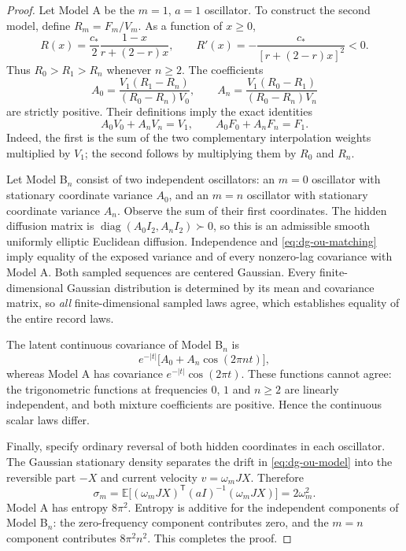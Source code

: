 \begin{proof}
Let Model A be the $m=1$, $a=1$ oscillator. To construct the second model,
define $R_m=F_m/V_m$. As a function of $x\geq0$,
\[
 R(x)=\frac{c_*}{2}\frac{1-x}{r+(2-r)x},\qquad
 R'(x)=-\frac{c_*}{[r+(2-r)x]^2}<0.
\]
Thus $R_0>R_1>R_n$ whenever $n\geq2$. The coefficients
\begin{equation}
 A_0=\frac{V_1(R_1-R_n)}{(R_0-R_n)V_0},\qquad
 A_n=\frac{V_1(R_0-R_1)}{(R_0-R_n)V_n}
 \label{eq:dg-ou-positive-weights}
\end{equation}
are strictly positive. Their definitions imply the exact identities
\begin{equation}
 A_0V_0+A_nV_n=V_1,\qquad
 A_0F_0+A_nF_n=F_1.
 \label{eq:dg-ou-matching}
\end{equation}
Indeed, the first is the sum of the two complementary interpolation
weights multiplied by $V_1$; the second follows by multiplying them by
$R_0$ and $R_n$.

Let Model B$_n$ consist of two independent oscillators: an $m=0$
oscillator with stationary coordinate variance $A_0$, and an $m=n$
oscillator with stationary coordinate variance $A_n$. Observe the sum
of their first coordinates. The hidden diffusion matrix is
$\operatorname{diag}(A_0I_2,A_nI_2)\succ0$, so this is an admissible smooth
uniformly elliptic Euclidean diffusion. Independence and
\eqref{eq:dg-ou-matching} imply equality of the exposed variance and of
every nonzero-lag covariance with Model A. Both sampled sequences are
centered Gaussian. Every finite-dimensional Gaussian distribution is
determined by its mean and covariance matrix, so \emph{all} finite-dimensional
sampled laws agree, which establishes equality of the entire record laws.

The latent continuous covariance of Model B$_n$ is
\[
 e^{-|t|}\bigl[A_0+A_n\cos(2\pi nt)\bigr],
\]
whereas Model A has covariance $e^{-|t|}\cos(2\pi t)$. These functions
cannot agree: the trigonometric functions at frequencies $0$, $1$ and
$n\geq2$ are linearly independent, and both mixture coefficients are
positive. Hence the continuous scalar laws differ.

Finally, specify ordinary reversal of both hidden coordinates in each
oscillator. The Gaussian stationary density separates the drift in
\eqref{eq:dg-ou-model} into the reversible part $-X$ and current velocity
$v=\omega_mJX$. Therefore
\begin{equation}
 \sigma_m
 =\mathbb E\bigl[(\omega_mJX)^{\mathsf T}(aI)^{-1}
                         (\omega_mJX)\bigr]
 =2\omega_m^2.
 \label{eq:dg-ou-entropy}
\end{equation}
Model A has entropy $8\pi^2$. Entropy is additive for the independent
components of Model B$_n$: the zero-frequency component contributes zero,
and the $m=n$ component contributes $8\pi^2n^2$. This completes the proof.
\end{proof}

